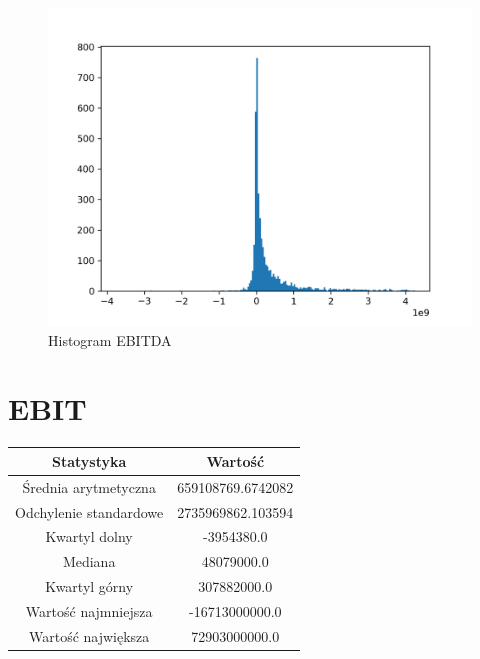 \documentclass{article}
\begin{document}
\begin{figure}[h!]
    \includegraphics[width=\linewidth]{variables/EBITDA.png}
    \caption{Histogram EBITDA }
\end{figure}\section{ EBIT }

\begin{center}
    \begin{tabular}{|c | c|} 
    \hline
    Statystyka & Wartość \\
    \hline\hline
    Średnia arytmetyczna & 659108769.6742082 \\ 
    \hline
    Odchylenie standardowe & 2735969862.103594 \\
    \hline
    Kwartyl dolny & -3954380.0 \\
    \hline
    Mediana & 48079000.0 \\
    \hline
    Kwartyl górny & 307882000.0 \\
    \hline
    Wartość najmniejsza & -16713000000.0 \\
    \hline
    Wartość największa & 72903000000.0 \\
    \hline
   \end{tabular}
\end{center}
\end{document}
